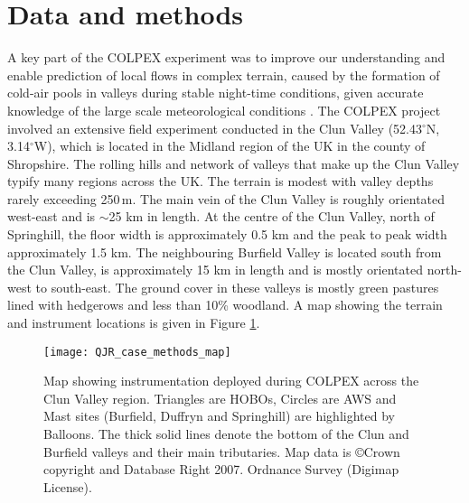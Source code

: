 \documentclass[times]{qjrms4}
\begin{document}
\section{Data and methods}
\label{methods}
A key part of the COLPEX experiment was to improve our understanding and enable prediction of local flows in complex terrain, caused by the formation of cold-air pools in valleys during stable night-time conditions, given accurate knowledge of the large scale meteorological conditions \citep{price2010COLPEX}. The COLPEX project involved an extensive field experiment conducted in the Clun Valley (52.43$^\circ$N, 3.14$^\circ$W), which is located in the Midland region of the UK in the county of Shropshire. The rolling hills and network of valleys that make up the Clun Valley typify many regions across the UK. The terrain is modest with valley depths rarely exceeding 250$\,\mbox{m}$. The main vein of the Clun Valley is roughly orientated west-east and is $\sim$25 km in length. At the centre of the Clun Valley, north of Springhill, the floor width is approximately 0.5 km and the peak to peak width approximately 1.5 km. The neighbouring Burfield Valley is located south from the Clun Valley, is approximately 15 km in length and is mostly orientated north-west to south-east. The ground cover in these valleys is mostly green pastures lined with hedgerows and less than 10\% woodland. A map showing the terrain and instrument locations is given in Figure \ref{fig:MAP}. 
%
	\begin{figure}
	\centering
	\texttt{[image: QJR\_case\_methods\_map]}
	\caption{Map showing instrumentation deployed during COLPEX across the Clun Valley region. Triangles are HOBOs, Circles are AWS and Mast sites (Burfield, Duffryn and Springhill) are highlighted by Balloons. The thick solid lines denote the bottom of the Clun and Burfield valleys and their main tributaries. Map data is \copyright Crown copyright and Database Right 2007. Ordnance Survey (Digimap License).}
	\label{fig:MAP}
	\end{figure}
\end{document}
